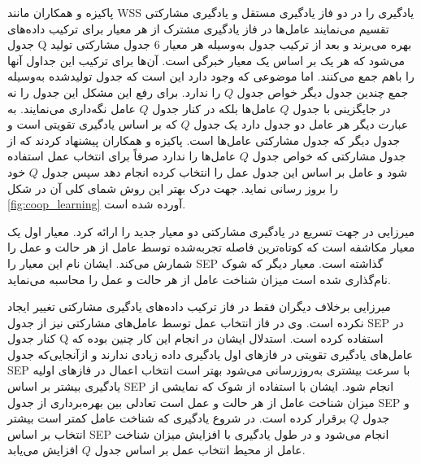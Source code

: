 پاکیزه و همکاران مانند WSS یادگیری را در دو فاز یادگیری مستقل و یادگیری مشارکتی تقسیم می‌نمایند عامل‌ها در فاز یادگیری مشترک از هر معیار برای ترکیب داده‌های جدول Q بهره می‌برند و بعد از ترکیب جدول به‌وسیله هر معیار 6 جدول مشارکتی تولید می‌شود که هر یک بر اساس یک معیار خبرگی است. آن‌ها برای ترکیب این جداول آنها را باهم جمع می‌کنند. اما موضوعی که وجود دارد این است که جدول تولیدشده به‌وسیله جمع چندین جدول دیگر خواص جدول $Q$ را ندارد. برای رفع این مشکل این جدول را نه در جایگزینی با جدول $Q$ عامل‌ها بلکه در کنار جدول $Q$ عامل نگه‌داری می‌نمایند. به عبارت دیگر هر عامل دو جدول دارد یک جدول $Q$ که بر اساس یادگیری تقویتی است و جدول دیگر که جدول مشارکتی عامل‌ها است. پاکیزه و همکاران پیشنهاد کردند که از جدول مشارکتی که خواص جدول $Q$ عامل‌ها را ندارد صرفاً برای انتخاب عمل استفاده شود و عامل بر اساس این جدول عمل را انتخاب کرده انجام دهد سپس جدول $Q$ خود را بروز رسانی نماید. جهت درک بهتر این روش شمای کلی آن در شکل \ref{fig:coop_learning} آورده شده است.


میرزایی در  جهت تسریع در یادگیری مشارکتی دو معیار جدید را ارائه کرد. معیار اول یک معیار مکاشفه است که کوتاه‌ترین فاصله تجربه‌شده توسط عامل از هر حالت و عمل را شمارش می‌کند. ایشان نام این معیار را SEP گذاشته است. معیار دیگر که شوک نام‌گذاری شده است میزان شناخت عامل از هر حالت و عمل را محاسبه می‌نماید.

میرزایی برخلاف دیگران فقط در فاز ترکیب داده‌های یادگیری مشارکتی تغییر ایجاد نکرده است. وی در فاز انتخاب عمل توسط عامل‌های مشارکتی نیز از جدول SEP در کنار جدول Q استفاده کرده است. استدلال ایشان در انجام این کار چنین بوده که عامل‌های یادگیری تقویتی در فازهای اول یادگیری داده زیادی ندارند و ازآنجایی‌که جدول SEP با سرعت بیشتری به‌روزرسانی می‌شود بهتر است انتخاب اعمال در فازهای اولیه یادگیری بیشتر بر اساس SEP انجام شود. ایشان با استفاده از شوک که نمایشی از میزان شناخت عامل از هر حالت و عمل است تعادلی بین بهره‌برداری از جدول SEP و جدول $Q$ برقرار کرده است. در شروع یادگیری که شناخت عامل کمتر است بیشتر انتخاب بر اساس SEP انجام می‌شود و در طول یادگیری با افزایش میزان شناخت عامل از محیط انتخاب عمل بر اساس جدول $Q$ افزایش می‌یابد.

